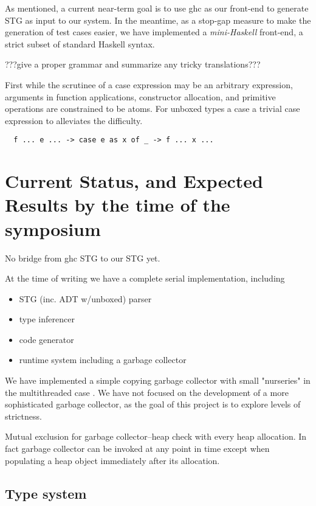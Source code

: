 \documentclass{llncs}
\begin{document}
As mentioned, a current near-term goal is to use ghc as our front-end
to generate STG as input to our system.  In the meantime, as a stop-gap
measure to make the generation of test cases easier, we have implemented
a \emph{mini-Haskell} front-end, a strict subset of standard Haskell syntax.

???give a proper grammar and summarize any tricky translations???




First while the scrutinee of a case expression may be an arbitrary expression,
arguments in function applications, constructor allocation, and primitive
operations are constrained to be atoms.  For unboxed types a case
a trivial case expression to alleviates
the difficulty.
\begin{verbatim}
  f ... e ... -> case e as x of _ -> f ... x ...
\end{verbatim}



\section{Current Status, and Expected Results by the time of the symposium}

No bridge from ghc STG to our STG yet.

At the time of writing we have a complete serial implementation, including
\begin{itemize}
\item STG (inc. ADT w/unboxed) parser
\item type inferencer
\item code generator
\item runtime system including a garbage collector
\end{itemize}

We have implemented a simple copying garbage collector \cite{Cheney:1970}
with small "nurseries" in the multithreaded case \cite{Marlow:2008}. We have not
focused on the development of a more sophisticated garbage collector, as the goal
of this project is to explore levels of strictness.

Mutual exclusion for garbage collector--heap check with every heap allocation.
In fact garbage collector can be invoked at any point in time except when
populating a heap object immediately after its allocation.



\subsection{Type system}
\end{document}
